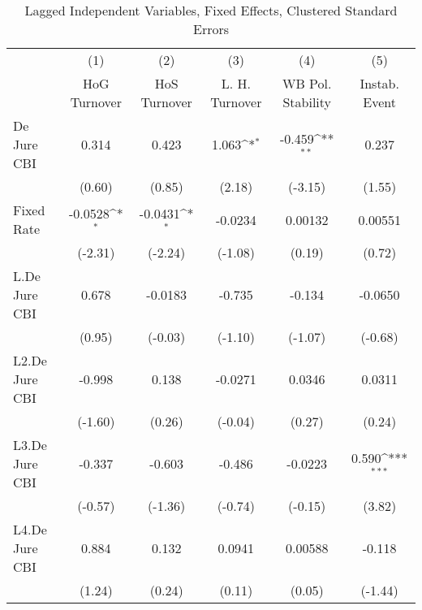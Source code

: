 {
\def\sym#1{\ifmmode^{#1}\else\(^{#1}\)\fi}
\begin{longtable}{l*{5}{c}}
\caption{Lagged Independent Variables, Fixed Effects, Clustered Standard Errors \label{lagsDJ}}\\
\hline\hline\endfirsthead\hline\endhead\hline\endfoot\endlastfoot
                &\multicolumn{1}{c}{(1)}&\multicolumn{1}{c}{(2)}&\multicolumn{1}{c}{(3)}&\multicolumn{1}{c}{(4)}&\multicolumn{1}{c}{(5)}\\
                &\multicolumn{1}{c}{HoG Turnover}&\multicolumn{1}{c}{HoS Turnover}&\multicolumn{1}{c}{L. H. Turnover}&\multicolumn{1}{c}{WB Pol. Stability}&\multicolumn{1}{c}{Instab. Event}\\
\hline
De Jure CBI     &    0.314         &    0.423         &    1.063\sym{*}  &   -0.459\sym{**} &    0.237         \\
                &   (0.60)         &   (0.85)         &   (2.18)         &  (-3.15)         &   (1.55)         \\
[1em]
Fixed Rate      &  -0.0528\sym{*}  &  -0.0431\sym{*}  &  -0.0234         &  0.00132         &  0.00551         \\
                &  (-2.31)         &  (-2.24)         &  (-1.08)         &   (0.19)         &   (0.72)         \\
[1em]
L.De Jure CBI   &    0.678         &  -0.0183         &   -0.735         &   -0.134         &  -0.0650         \\
                &   (0.95)         &  (-0.03)         &  (-1.10)         &  (-1.07)         &  (-0.68)         \\
[1em]
L2.De Jure CBI  &   -0.998         &    0.138         &  -0.0271         &   0.0346         &   0.0311         \\
                &  (-1.60)         &   (0.26)         &  (-0.04)         &   (0.27)         &   (0.24)         \\
[1em]
L3.De Jure CBI  &   -0.337         &   -0.603         &   -0.486         &  -0.0223         &    0.590\sym{***}\\
                &  (-0.57)         &  (-1.36)         &  (-0.74)         &  (-0.15)         &   (3.82)         \\
[1em]
L4.De Jure CBI  &    0.884         &    0.132         &   0.0941         &  0.00588         &   -0.118         \\
                &   (1.24)         &   (0.24)         &   (0.11)         &   (0.05)         &  (-1.44)         \\

\end{longtable}}
